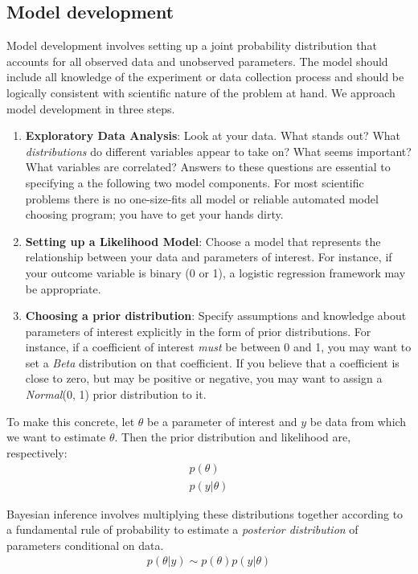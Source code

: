 \documentclass[12pt, oneside]{article}
\begin{document}
\subsection{Model development}
Model development involves setting up a joint probability distribution that accounts for all observed data and unobserved parameters. The model should include all knowledge of the experiment or data collection process and should be logically consistent with scientific nature of the problem at hand. We approach model development in three steps.
\begin{enumerate}
\item{\textbf{Exploratory Data Analysis}: Look at your data.  What stands out?  What \emph{distributions} do different variables appear to take on?  What seems important?  What variables are correlated?  Answers to these questions are essential to specifying a the following two model components.  For most scientific problems there is no one-size-fits all model or reliable automated model choosing program; you have to get your hands dirty.}
\item{\textbf{Setting up a Likelihood Model}: Choose a model that represents the relationship between your data and parameters of interest.  For instance, if your outcome variable is binary (0 or 1), a logistic regression framework may be appropriate.}
\item{\textbf{Choosing a prior distribution}: Specify assumptions and knowledge about parameters of interest explicitly in the form of prior distributions.  For instance, if a coefficient of interest \emph{must} be between 0 and 1, you may want to set a \emph{Beta} distribution on that coefficient.  If you believe that a coefficient is close to zero, but may be positive or negative, you may want to assign a \emph{Normal}(0, 1) prior distribution to it.}
\end{enumerate}

To make this concrete, let $\theta$ be a parameter of interest and $y$ be data from which we want to estimate $\theta$.  Then the prior distribution and likelihood are, respectively:
\begin{align}
p(\theta) \\
p(y | \theta)
\end{align}

Bayesian inference involves multiplying these distributions together according to a fundamental rule of probability to estimate a \emph{posterior distribution} of parameters conditional on data.
\begin{align}
p(\theta | y) \sim p(\theta) p(y |\theta)
\end{align}
\end{document}
